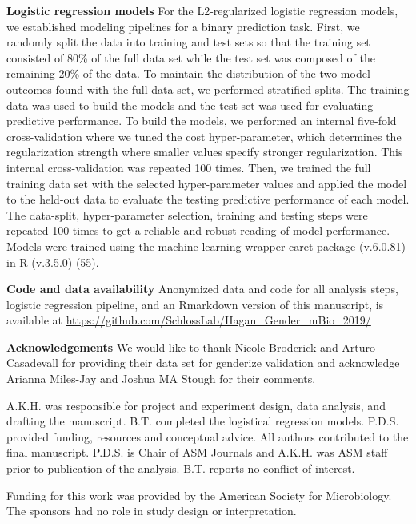 \documentclass[11pt,]{article}
\begin{document}
\textbf{Logistic regression models} For the L2-regularized logistic
regression models, we established modeling pipelines for a binary
prediction task. First, we randomly split the data into training and
test sets so that the training set consisted of 80\% of the full data
set while the test set was composed of the remaining 20\% of the data.
To maintain the distribution of the two model outcomes found with the
full data set, we performed stratified splits. The training data was
used to build the models and the test set was used for evaluating
predictive performance. To build the models, we performed an internal
five-fold cross-validation where we tuned the cost hyper-parameter,
which determines the regularization strength where smaller values
specify stronger regularization. This internal cross-validation was
repeated 100 times. Then, we trained the full training data set with the
selected hyper-parameter values and applied the model to the held-out
data to evaluate the testing predictive performance of each model. The
data-split, hyper-parameter selection, training and testing steps were
repeated 100 times to get a reliable and robust reading of model
performance. Models were trained using the machine learning wrapper
caret package (v.6.0.81) in R (v.3.5.0) (55).

\textbf{Code and data availability} Anonymized data and code for all
analysis steps, logistic regression pipeline, and an Rmarkdown version
of this manuscript, is available at
\url{https://github.com/SchlossLab/Hagan_Gender_mBio_2019/}

\textbf{Acknowledgements} We would like to thank Nicole Broderick and
Arturo Casadevall for providing their data set for genderize validation
and acknowledge Arianna Miles-Jay and Joshua MA Stough for their
comments.

A.K.H. was responsible for project and experiment design, data analysis,
and drafting the manuscript. B.T. completed the logistical regression
models. P.D.S. provided funding, resources and conceptual advice. All
authors contributed to the final manuscript. P.D.S. is Chair of ASM
Journals and A.K.H. was ASM staff prior to publication of the analysis.
B.T. reports no conflict of interest.

Funding for this work was provided by the American Society for
Microbiology. The sponsors had no role in study design or
interpretation.

\newpage
\end{document}
